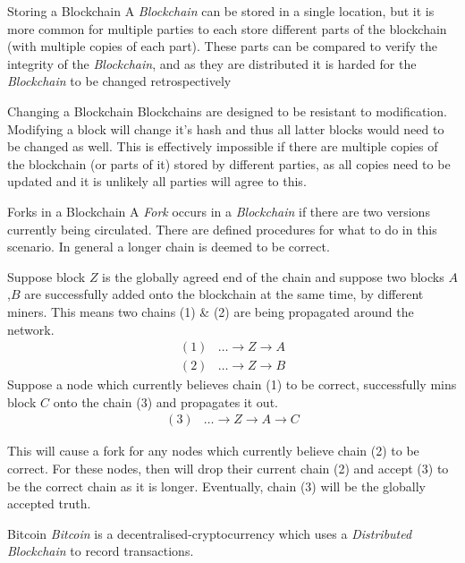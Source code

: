 \documentclass[11pt,a4paper]{article}
\begin{document}
  \begin{remark}{Storing a Blockchain}
    A \textit{Blockchain} can be stored in a single location, but it is more common for multiple parties to each store different parts of the blockchain (with multiple copies of each part). These parts can be compared to verify the integrity of the \textit{Blockchain}, and as they are distributed it is harded for the \textit{Blockchain} to be changed retrospectively
  \end{remark}

  \begin{remark}{Changing a Blockchain}
    Blockchains are designed to be resistant to modification. Modifying a block will change it's hash and thus all latter blocks would need to be changed as well. This is effectively impossible if there are multiple copies of the blockchain (or parts of it) stored by different parties, as all copies need to be updated and it is unlikely all parties will agree to this.
  \end{remark}

  \begin{proposition}{Forks in a Blockchain}
    A \textit{Fork} occurs in a \textit{Blockchain} if there are two versions currently being circulated. There are defined procedures for what to do in this scenario. In general a longer chain is deemed to be correct.
    \par Suppose block $Z$ is the globally agreed end of the chain and suppose two blocks $A$,$B$ are successfully added onto the blockchain at the same time, by different miners. This means two chains (1) \& (2) are being propagated around the network.
    \[\begin{array}{rl}
      (1)&\dots \to Z\to A\\
      (2)&\dots \to Z\to B
    \end{array}\]
    Suppose a node which currently believes chain (1) to be correct, successfully mins block $C$ onto the chain (3) and propagates it out.
    \[\begin{array}{rl}
      (3)&\dots \to Z\to A\to C
    \end{array}\]
  \end{proposition}
  This will cause a fork for any nodes which currently believe chain (2) to be correct. For these nodes, then will drop their current chain (2) and accept (3) to be the correct chain as it is longer. Eventually, chain (3) will be the globally accepted truth.

  \begin{definition}{Bitcoin}
    \textit{Bitcoin} is a decentralised-cryptocurrency which uses a \textit{Distributed Blockchain} to record transactions.
  \end{definition}
\end{document}
